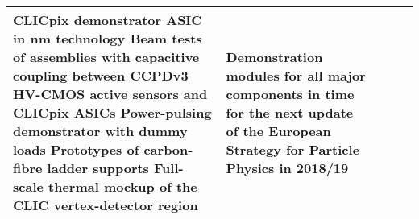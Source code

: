 \begin{landscape}
\begin{sidewaystable}
\begin{adjustbox}{max width=1.1\textwidth,totalheight=1\textheight}
\begin{tabularx}{2\textheight}{lXXXX}
        CLICpix demonstrator ASIC in \unit[65]{nm} technology\newline
        Beam tests of assemblies with capacitive coupling between CCPDv3 HV-CMOS active sensors
        and CLICpix ASICs\newline
        Power-pulsing demonstrator with dummy loads\newline
        Prototypes of carbon-fibre ladder supports\newline
        Full-scale thermal mockup of the CLIC vertex-detector region
        &
        Demonstration modules for all major components
        in time for the next update of the European Strategy
        for Particle Physics in 2018/19
        \\
    \bottomrule
\end{tabularx}
\end{adjustbox}
\end{sidewaystable}
\end{landscape}
\restoregeometry
